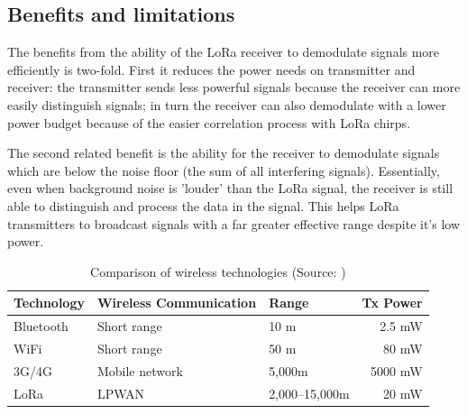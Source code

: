 \subsection{Benefits and limitations}

The benefits from the ability of the LoRa receiver to demodulate signals more
efficiently is two-fold. First it reduces the power needs on transmitter and
receiver: the transmitter sends less powerful signals because the receiver can
more easily distinguish signals; in turn the receiver can also demodulate with a
lower power budget because of the easier correlation process with LoRa chirps.

The second related benefit is the ability for the receiver to demodulate signals
which are below the noise floor (the sum of all interfering signals).
Essentially, even when background noise is 'louder' than the LoRa signal, the
receiver is still able to distinguish and process the data in the signal. This
helps LoRa transmitters to broadcast signals with a far greater effective range
despite it's low power. 

\begin{table}[ht]
  \centering
  \begin{tabular}{|l|l|p{4.5cm}|r|}
    \hline
\textbf{Technology} & \textbf{Wireless Communication} & \textbf{Range} &
\textbf{Tx Power} \\
    \hline
    Bluetooth & Short range & 10 m & 2.5 mW \\
    \hline
    WiFi & Short range & 50 m & 80 mW \\
    \hline
    3G/4G & Mobile network & 5,000m & 5000 mW \\
    \hline
    LoRa & LPWAN & \parbox[t]{4.5cm}{2,000--15,000m} & 20 mW \\
    \hline
  \end{tabular}
    \caption{Comparison of wireless technologies (Source:
  \cite{lie_lora_readthedocs})}
\end{table}
